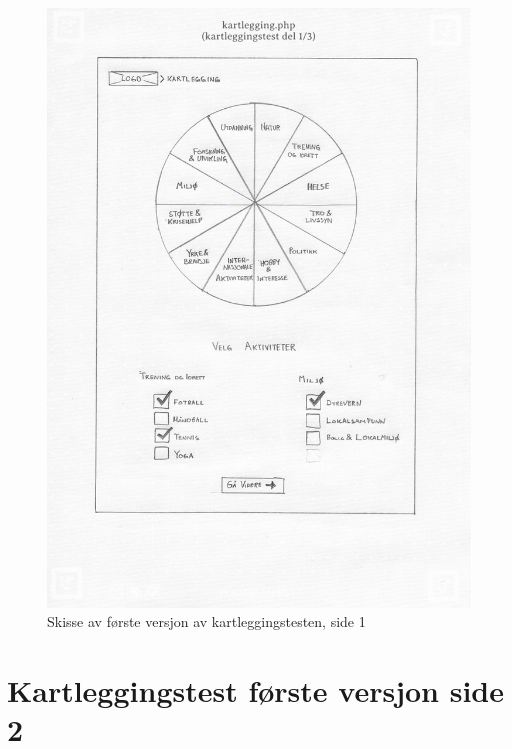 \begin{figure}[H]
\centering
\includegraphics[width=.9\textwidth]{Illustrasjoner/Skisser-pdf/1.0/1-6-kartlegging-med-hjul.pdf}
\caption{Skisse av første versjon av kartleggingstesten, side 1}
\label{vedlegg:1-6-kartlegging-hjul}
\end{figure}

\section{Kartleggingstest første versjon side 2}

